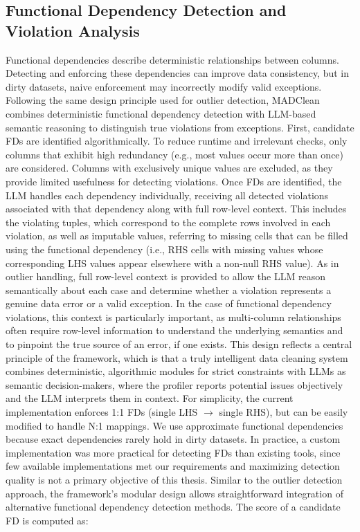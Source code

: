\subsection{Functional Dependency Detection and Violation Analysis}
Functional dependencies describe deterministic relationships between columns. 
Detecting and enforcing these dependencies can improve data consistency, but in dirty datasets, naive enforcement may incorrectly modify valid exceptions. 
Following the same design principle used for outlier detection, MADClean combines deterministic functional dependency detection with LLM-based semantic reasoning to distinguish true violations from exceptions.
\newline\newline
First, candidate FDs are identified algorithmically. 
To reduce runtime and irrelevant checks, only columns that exhibit high redundancy (e.g., most values occur more than once) are considered.
Columns with exclusively unique values are excluded, as they provide limited usefulness for detecting violations. 
Once FDs are identified, the LLM handles each dependency individually, receiving all detected violations associated with that dependency along with full row-level context. 
This includes the violating tuples, which correspond to the complete rows involved in each violation, as well as imputable values, referring to missing cells that can be filled using the functional dependency (i.e., RHS cells with missing values whose corresponding LHS values appear elsewhere with a non-null RHS value). 
As in outlier handling, full row-level context is provided to allow the LLM reason semantically about each case and determine whether a violation represents a genuine data error or a valid exception.
In the case of functional dependency violations, this context is particularly important, as multi-column relationships often require row-level information to understand the underlying semantics and to pinpoint the true source of an error, if one exists.
This design reflects a central principle of the framework, which is that a truly intelligent data cleaning system combines deterministic, algorithmic modules for strict constraints with LLMs as semantic decision-makers, where the profiler reports potential issues objectively and the LLM interprets them in context.
\newline\newline
For simplicity, the current implementation enforces 1:1 FDs (single LHS $\rightarrow$ single RHS), but can be easily modified to handle N:1 mappings. 
We use approximate functional dependencies because exact dependencies rarely hold in dirty datasets. 
In practice, a custom implementation was more practical for detecting FDs than existing tools, since few available implementations met our requirements and maximizing detection quality is not a primary objective of this thesis.
Similar to the outlier detection approach, the framework's modular design allows straightforward integration of alternative functional dependency detection methods.
The score of a candidate FD is computed as:

